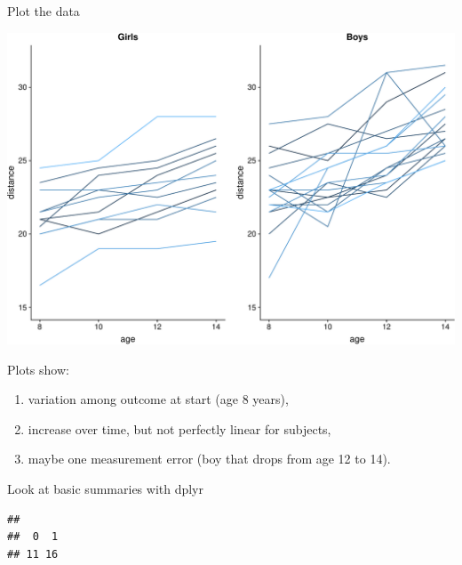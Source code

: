 \documentclass[ignorenonframetext,]{beamer}
\newenvironment{Shaded}{\begin{snugshade}}{\end{snugshade}}
\newcommand{\KeywordTok}[1]{\textcolor[rgb]{0.13,0.29,0.53}{\textbf{#1}}}
\newcommand{\DataTypeTok}[1]{\textcolor[rgb]{0.13,0.29,0.53}{#1}}
\newcommand{\StringTok}[1]{\textcolor[rgb]{0.31,0.60,0.02}{#1}}
\newcommand{\CommentTok}[1]{\textcolor[rgb]{0.56,0.35,0.01}{\textit{#1}}}
\newcommand{\OperatorTok}[1]{\textcolor[rgb]{0.81,0.36,0.00}{\textbf{#1}}}
\newcommand{\NormalTok}[1]{#1}
\providecommand{\tightlist}{%
  \setlength{\itemsep}{0pt}\setlength{\parskip}{0pt}}
\begin{document}
\begin{frame}{Plot the data}

\includegraphics{Chapter5CodePart1_files/figure-beamer/plot1-1.pdf}

\end{frame}

\begin{frame}{Plots show:}

\begin{enumerate}
\def\labelenumi{\arabic{enumi}.}
\tightlist
\item
  variation among outcome at start (age 8 years),
\item
  increase over time, but not perfectly linear for subjects,
\item
  maybe one measurement error (boy that drops from age 12 to 14).
\end{enumerate}

\end{frame}

\begin{frame}[fragile]{Look at basic summaries with dplyr}

\begin{Shaded}
\end{Shaded}

\begin{verbatim}
## 
##  0  1 
## 11 16
\end{verbatim}

\end{frame}
\end{document}
